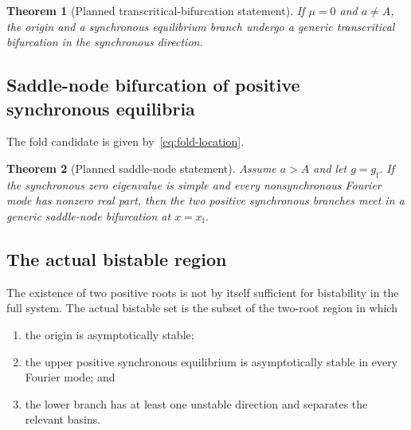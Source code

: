 \documentclass[11pt, reqno]{amsart}
\newtheorem{theorem}{Theorem}[section]
\theoremstyle{definition}
\theoremstyle{remark}
\begin{document}
	\begin{theorem}[Planned transcritical-bifurcation statement]
		If $\mu=0$ and $a\ne A$, the origin and a synchronous equilibrium branch
		undergo a generic transcritical bifurcation in the synchronous direction.
	\end{theorem}
	
	
	\subsection{Saddle-node bifurcation of positive synchronous equilibria}
	
	The fold candidate is given by~\eqref{eq:fold-location}.
	
	\begin{theorem}[Planned saddle-node statement]
		Assume $a>A$ and let $g=g_{\mathrm f}$.  If the synchronous zero eigenvalue is
		simple and every nonsynchronous Fourier mode has nonzero real part, then the two
		positive synchronous branches meet in a generic saddle-node bifurcation at
		$x=x_{\mathrm f}$.
	\end{theorem}
	
	
	\subsection{The actual bistable region}
	
	The existence of two positive roots is not by itself sufficient for bistability
	in the full system.  The actual bistable set is the subset of the two-root
	region in which
	\begin{enumerate}[label=(\roman*),leftmargin=2.5em]
		\item the origin is asymptotically stable;
		\item the upper positive synchronous equilibrium is asymptotically stable
		in every Fourier mode; and
		\item the lower branch has at least one unstable direction and separates
		the relevant basins.
	\end{enumerate}
	
	
\end{document}
